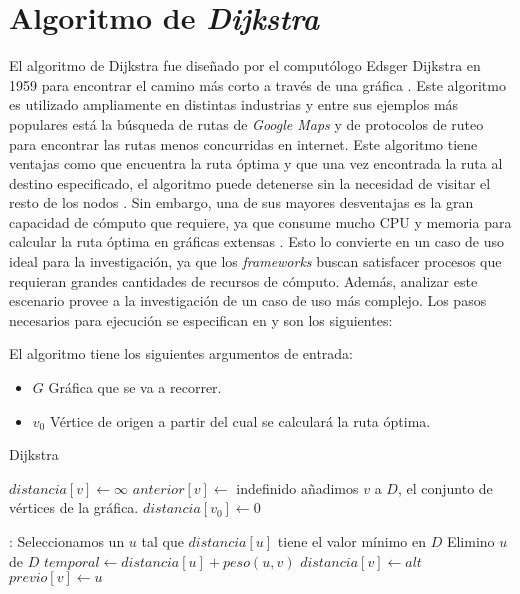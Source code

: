 \section{Algoritmo de \textit{Dijkstra}}


El algoritmo de Dijkstra fue diseñado por el computólogo Edsger Dijkstra en 1959 para encontrar el camino más corto a través de una gráfica \cite{dijkstraexplicado}. Este algoritmo es utilizado ampliamente en distintas industrias y entre sus ejemplos más populares está la búsqueda de rutas de \textit{Google Maps} y de protocolos de ruteo para encontrar las rutas menos concurridas en internet. Este algoritmo tiene ventajas como que encuentra la ruta óptima y que una vez encontrada la ruta al destino especificado, el algoritmo puede detenerse sin la necesidad de visitar el resto de los nodos \cite{dijkstrabellford}. Sin embargo, una de sus mayores desventajas es la gran capacidad de cómputo que requiere, ya que consume mucho CPU y memoria para calcular la ruta óptima en gráficas extensas \cite{dijkstrabellford}. Esto lo convierte en un caso de uso ideal para la investigación, ya que los \textit{frameworks} buscan satisfacer procesos que requieran grandes cantidades de recursos de cómputo. Además, analizar este escenario provee a la investigación de un caso de uso más complejo. Los pasos necesarios para ejecución se especifican en \cite{dijkstrabellford} y son los siguientes:

El algoritmo tiene los siguientes argumentos de entrada:
\begin{itemize}
	\item $G$ Gráfica que se va a recorrer.
	\item $v_{0}$ Vértice de origen a partir del cual se calculará la ruta óptima.
\end{itemize}

\begin{algoritmo}[H]
\caption{Dijkstra}\label{Dijkstra}
\begin{algorithmic}[1]
	\State $distancia[v] \gets \infty$
	\State $anterior[v] \gets $ indefinido
	\State añadimos $v$ a $D$, el conjunto de vértices de la gráfica.
\EndFor
\State $distancia[v_{0}] \gets 0$

:
	\State Seleccionamos un $u$ tal que $distancia[u]$ tiene el valor mínimo en $D$
	\State Elimino $u$ de $D$
		\State $temporal \gets distancia[u] + peso(u, v)$
			\State $distancia[v] \gets alt$
			\State $previo[v] \gets u$		
		\EndIf
	\EndFor
\EndWhile
\EndProcedure
\end{algorithmic}
\end{algoritmo}

